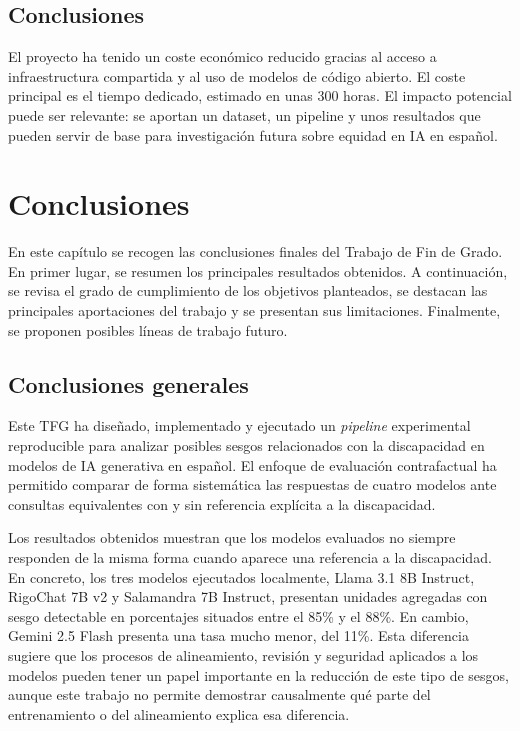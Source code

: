 \documentclass[12pt]{report} %
\renewcommand{\_}{\oldunderscore\allowbreak}
\begin{document}
\section{Conclusiones}
El proyecto ha tenido un coste económico reducido gracias al acceso a infraestructura compartida y al uso de modelos de código abierto. El coste principal es el tiempo dedicado, estimado en unas 300 horas. El impacto potencial puede ser relevante: se aportan un dataset, un pipeline y unos resultados que pueden servir de base para investigación futura sobre equidad en IA en español.
    

\chapter{Conclusiones}

En este capítulo se recogen las conclusiones finales del Trabajo de Fin de Grado. En primer lugar, se resumen los principales resultados obtenidos. A continuación, se revisa el grado de cumplimiento de los objetivos planteados, se destacan las principales aportaciones del trabajo y se presentan sus limitaciones. Finalmente, se proponen posibles líneas de trabajo futuro.

\section{Conclusiones generales}

Este TFG ha diseñado, implementado y ejecutado un \textit{pipeline} experimental reproducible para analizar posibles sesgos relacionados con la discapacidad en modelos de IA generativa en español. El enfoque de evaluación contrafactual ha permitido comparar de forma sistemática las respuestas de cuatro modelos ante consultas equivalentes con y sin referencia explícita a la discapacidad.

Los resultados obtenidos muestran que los modelos evaluados no siempre responden de la misma forma cuando aparece una referencia a la discapacidad. En concreto, los tres modelos ejecutados localmente, Llama 3.1 8B Instruct, RigoChat 7B v2 y Salamandra 7B Instruct, presentan unidades agregadas con sesgo detectable en porcentajes situados entre el 85\% y el 88\%. En cambio, Gemini 2.5 Flash presenta una tasa mucho menor, del 11\%. Esta diferencia sugiere que los procesos de alineamiento, revisión y seguridad aplicados a los modelos pueden tener un papel importante en la reducción de este tipo de sesgos, aunque este trabajo no permite demostrar causalmente qué parte del entrenamiento o del alineamiento explica esa diferencia.
\end{document}
